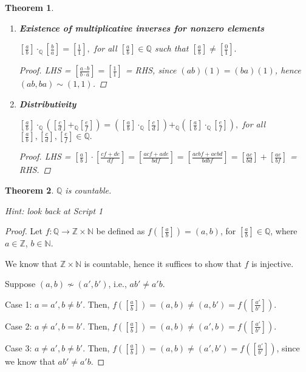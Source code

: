 \documentclass[11pt]{article}
\newcommand{\bbN}{\mathbb{N}}
\newcommand{\bbQ}{\mathbb{Q}}
\newcommand{\bbZ}{\mathbb{Z}}
\renewcommand{\_}[1]{\underline{ #1 }}
\newtheorem{theorem}{Theorem}[section]
\theoremstyle{definition}
\newcommand{\N}{\mathbb{N}}
\newcommand{\Z}{\mathbb{Z}}
\newcommand{\Q}{\mathbb Q}
\numberwithin{equation}{subsection}
\begin{document}
\begin{theorem}
\begin{enumerate}
    \item[h)] {\bf Existence of multiplicative inverses for nonzero elements}
    
    $\displaystyle \left[\frac{a}{b}\right] \cdot_{\bbQ}\left[\frac{b}{a}\right]=\left[\frac{1}{1}\right],$ for all $\displaystyle \left[\frac{a}{b}\right] \in\bbQ$ such that $\displaystyle\left[\frac{a}{b}\right]\neq \left[\frac{0}{1}\right].$ 
    
\begin{proof}
LHS = $[\frac{a \cdot b}{b \cdot a}] = [\frac{1}{1}]$ = RHS, since $(ab)(1) = (ba)(1)$, hence $(ab,ba)\sim (1,1)$.

\renewcommand\qedsymbol{QED}
\end{proof}

  \item[i)] {\bf Distributivity} 
  
  $\displaystyle \left[\frac{a}{b}\right]\cdot_{\bbQ} \left(\left[\frac{c}{d}\right]+_{\bbQ}\left[\frac{e}{f}\right]\right)=\left(\left[\frac{a}{b}\right]\cdot_{\bbQ} \left[\frac{c}{d}\right]\right) +_{\bbQ} \left( \left[\frac{a}{b}\right]\cdot_{\bbQ} \left[\frac{e}{f}\right]\right),$ for all $\displaystyle \left[\frac{a}{b}\right],\left[\frac{c}{d}\right], \left[\frac{e}{f}\right] \in\bbQ.$  

\begin{proof}
LHS = $[\frac{a}{b}] \cdot [\frac{cf+de}{df}] = [\frac{acf+ade}{bdf}] = [\frac{acbf + aebd}{bdbf}] = [\frac{ac}{bd}] + [\frac{ae}{bf}]$ = RHS.

\renewcommand\qedsymbol{QED}
\end{proof}

   \end{enumerate}    



\end{theorem}


\begin{theorem} 

$\Q$ is countable.
\end{theorem}
{\em Hint: look back at Script 1} \bigskip
\begin{proof}
Let $f \colon \Q \rightarrow \bbZ \times \bbN$ be defined as $f([\frac{a}{b}]) = (a,b)$, for $[\frac{a}{b}] \in \Q$, where $a \in \Z$, $b \in \N$.

We know that $\bbZ \times \bbN$ is countable, hence it suffices to show that $f$ is injective.

Suppose $(a,b) \not \sim (a',b')$, i.e., $ab' \not= a'b$. 

Case 1: $a=a', b\not= b'$. Then, $f([\frac{a}{b}]) = (a,b) \not= (a,b') = f([\frac{a'}{b'}])$.

Case 2: $a\not=a', b= b'$. Then, $f([\frac{a}{b}]) = (a,b) \not= (a',b) = f([\frac{a'}{b'}])$.

Case 3: $a\not=a', b\not= b'$. Then, $f([\frac{a}{b}]) = (a,b) \not= (a',b') = f([\frac{a'}{b'}])$, since we know that $ab' \not= a'b$.

\renewcommand\qedsymbol{QED}
\end{proof}
\end{document}
